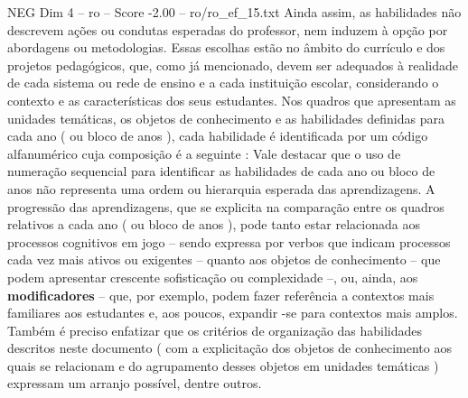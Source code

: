 \begin{textsample}{NEG Dim 4 – ro – Score -2.00 – ro/ro\_ef\_15.txt}
Ainda assim, as habilidades não descrevem ações ou condutas esperadas do professor, nem induzem à opção por abordagens ou metodologias.
Essas escolhas estão no âmbito do currículo e dos projetos pedagógicos, que, como já mencionado, devem ser adequados à realidade de cada sistema ou rede de ensino e a cada instituição escolar, considerando o contexto e as características dos seus estudantes.
Nos quadros que apresentam as unidades temáticas, os objetos de conhecimento e as habilidades definidas para cada ano ( ou bloco de anos ), cada habilidade é identificada por um código alfanumérico cuja composição é a seguinte : Vale destacar que o uso de numeração sequencial para identificar as habilidades de cada ano ou bloco de anos não representa uma ordem ou hierarquia esperada das aprendizagens.
A progressão das aprendizagens, que se explicita na comparação entre os quadros relativos a cada ano ( ou bloco de anos ), pode tanto estar relacionada aos processos cognitivos em jogo – sendo expressa por verbos que indicam processos cada vez mais ativos ou exigentes – quanto aos objetos de conhecimento – que podem apresentar crescente sofisticação ou complexidade –, ou, ainda, aos \textbf{modificadores} – que, por exemplo, podem fazer referência a contextos mais familiares aos estudantes e, aos poucos, expandir -se para contextos mais amplos.
Também é preciso enfatizar que os critérios de organização das habilidades descritos neste documento ( com a explicitação dos objetos de conhecimento aos quais se relacionam e do agrupamento desses objetos em unidades temáticas ) expressam um arranjo possível, dentre outros.

\end{textsample}
